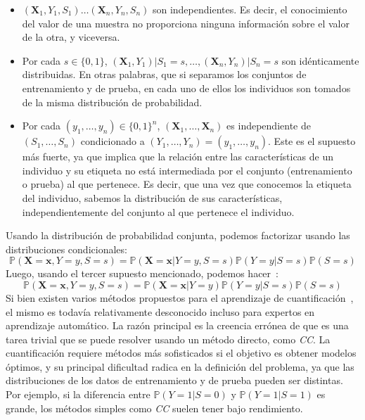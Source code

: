 \begin{itemize}
  \item $(\boldsymbol{X}_1,Y_1,S_1) \dots (\boldsymbol{X}_n,Y_n,S_n)$ son
  independientes. Es decir, el conocimiento del valor de una muestra no
  proporciona ninguna información sobre el valor de la otra, y viceversa.
  \item Por cada $s \in \{0,1\}$,
  $(\boldsymbol{X}_1,Y_1)|S_1=s,\dots,(\boldsymbol{X}_n,Y_n)|S_n=s$ son
  idénticamente distribuidas. En otras palabras, que si separamos los conjuntos
  de entrenamiento y de prueba, en cada uno de ellos los individuos son tomados
  de la misma distribución de probabilidad.
  \item Por cada $(y_1,\dots,y_n)\in{\{0,1\}}^n$,
  $(\boldsymbol{X}_1,\dots,\boldsymbol{X}_n)$ es independiente de
  $(S_1,\dots,S_n)$ condicionado a $(Y_1,\dots,Y_n)=(y_1,\dots,y_n)$. Este es el
  supuesto más fuerte, ya que implica que la relación entre las características
  de un individuo y su etiqueta no está intermediada por el conjunto
  (entrenamiento o prueba) al que pertenece. Es decir, que una vez que conocemos
  la etiqueta del individuo, sabemos la distribución de sus características,
  independientemente del conjunto al que pertenece el individuo.
\end{itemize}

Usando la distribución de probabilidad conjunta, podemos factorizar usando las
distribuciones condicionales:
\begin{equation}
    \mathbb{P}(\boldsymbol{X}=\boldsymbol{x},Y=y,S=s)=\mathbb{P}(\boldsymbol{X}=\boldsymbol{x}|Y=y,S=s)\mathbb{P}(Y=y|S=s)\mathbb{P}(S=s)
\end{equation}
Luego, usando el tercer supuesto mencionado, podemos
hacer~\cite{moreno2012unifying}:
\begin{equation}
    \mathbb{P}(\boldsymbol{X}=\boldsymbol{x},Y=y,S=s)=\mathbb{P}(\boldsymbol{X}=\boldsymbol{x}|Y=y)\mathbb{P}(Y=y|S=s)\mathbb{P}(S=s)
\end{equation}
Si bien existen varios métodos propuestos para el aprendizaje de
cuantificación~\cite{esuli2023learning, gonzalez2017review}, el mismo es todavía
relativamente desconocido incluso para expertos en aprendizaje automático. La
razón principal es la creencia errónea de que es una tarea trivial que se puede
resolver usando un método directo, como {\it CC}. La cuantificación requiere
métodos más sofisticados si el objetivo es obtener modelos óptimos, y su
principal dificultad radica en la definición del problema, ya que las
distribuciones de los datos de entrenamiento y de prueba pueden ser distintas.
Por ejemplo, si la diferencia entre $\mathbb{P}(Y=1|S=0)$ y
$\mathbb{P}(Y=1|S=1)$ es grande, los métodos simples como {\it CC\/} suelen
tener bajo rendimiento.

